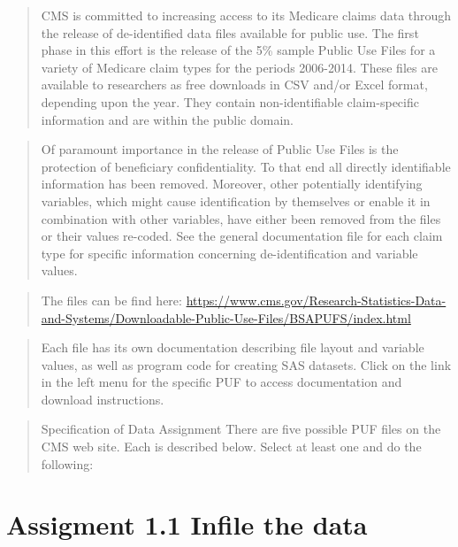 \documentclass[]{article}
\begin{document}
\begin{quote}
CMS is committed to increasing access to its Medicare claims data
through the release of de-identified data files available for public
use. The first phase in this effort is the release of the 5\% sample
Public Use Files for a variety of Medicare claim types for the periods
2006-2014. These files are available to researchers as free downloads in
CSV and/or Excel format, depending upon the year. They contain
non-identifiable claim-specific information and are within the public
domain.
\end{quote}

\begin{quote}
Of paramount importance in the release of Public Use Files is the
protection of beneficiary confidentiality. To that end all directly
identifiable information has been removed. Moreover, other potentially
identifying variables, which might cause identification by themselves or
enable it in combination with other variables, have either been removed
from the files or their values re-coded. See the general documentation
file for each claim type for specific information concerning
de-identification and variable values.
\end{quote}

\begin{quote}
The files can be find here:
\url{https://www.cms.gov/Research-Statistics-Data-and-Systems/Downloadable-Public-Use-Files/BSAPUFS/index.html}
\end{quote}

\begin{quote}
Each file has its own documentation describing file layout and variable
values, as well as program code for creating SAS datasets. Click on the
link in the left menu for the specific PUF to access documentation and
download instructions.
\end{quote}

\begin{quote}
Specification of Data Assignment There are five possible PUF files on
the CMS web site. Each is described below. Select at least one and do
the following:
\end{quote}

\hypertarget{assigment-1.1-infile-the-data}{%
\section{Assigment 1.1 Infile the
data}\label{assigment-1.1-infile-the-data}}
\end{document}
